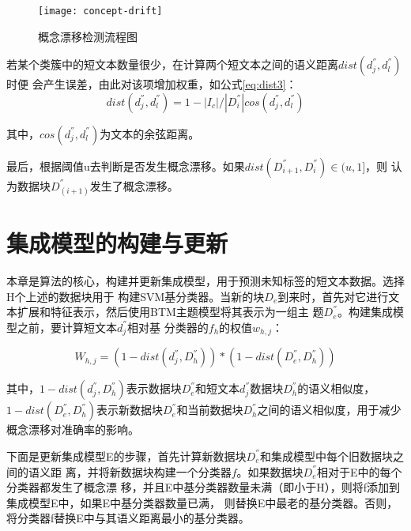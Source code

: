 \begin{figure}[H]
  \centering
  \texttt{[image: concept-drift]}
  \caption{概念漂移检测流程图}
  \label{fig:concept-drift}
\end{figure}

若某个类簇中的短文本数量很少，在计算两个短文本之间的语义距离$dist(d_j^{''},d_l^{''})$时便
会产生误差，由此对该项增加权重，如公式\ref{eq:dist3}：
\begin{equation}
  \label{eq:dist3}
   dist(d_j^{''},d_l^{''})=1-|I_c|/|D_i^{''}|cos(d_j^{''},d_l^{''})
 \end{equation}
 
其中，$cos(d_j^{''},d_l^{''})$为文本的余弦距离。


最后，根据阈值u去判断是否发生概念漂移。如果$dist(D_{i+1}^{''},D_i^{''}) \in (u,1]$，则
认为数据块$D_{(i+1)}^{''}$发生了概念漂移。

\section{集成模型的构建与更新}
本章是算法的核心，构建并更新集成模型，用于预测未知标签的短文本数据。选择H个上述的数据块用于
构建SVM基分类器。当新的块$D_e$到来时，首先对它进行文本扩展和特征表示，然后使用BTM主题模型将其表示为一组主
题$D_e^{''}$。构建集成模型之前，要计算短文本$d_j^{''}$相对基
分类器的${f_h}$的权值$w_{h,j}$：

\begin{equation}
  \label{eq:w}
W_{h,j}  = (1-dist(d_j^{''},D_h^{''})) * (1-dist(D_e^{''}, D_h^{''}))
\end{equation}

其中，$1-dist(d_j^{''},D_h^{''})$表示数据块$D_e^{''}$和短文本$d_j^{''}$数据块$D_h^{''}$的语义相似度，$1-dist(D_e^{''},D_h^{''})$表示新数据块$D_e^{''}$和当前数据块$D_h^{''}$之间的语义相似度，用于减少概念漂移对准确率的影响。

下面是更新集成模型E的步骤，首先计算新数据块$D_e^{''}$和集成模型中每个旧数据块之间的语义距
离，并将新数据块构建一个分类器$f$。如果数据块$D_e^{''}$相对于E中的每个分类器都发生了概念漂
移，并且E中基分类器数量未满（即小于H），则将f添加到集成模型E中，如果E中基分类器数量已满，
则替换E中最老的基分类器。否则，将分类器f替换E中与其语义距离最小的基分类器。


